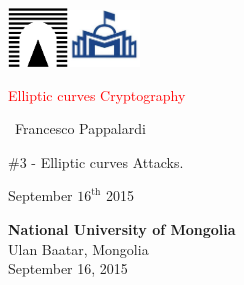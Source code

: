 \documentclass[10pt,handout]{beamer} %
\title[Elliptic curves over $\F_{q}$]{\insertlecture}
\theoremstyle{definition}
\begin{document}
\begin{frame}
\includegraphics[width=1.6cm]{images/roma3.pdf}\hfill\includegraphics[width=1.9cm]{images/NUM2.jpeg}
\vfill

\begin{center}\begin{sc}
\begin{Large}

\textcolor{red}{Elliptic curves Cryptography}
\end{Large}\bigskip

\ {Francesco Pappalardi}\bigskip\bigskip

\begin{large}\begin{bf}\#3 - Elliptic curves Attacks.
\end{bf}\end{large}\medskip

September $16^{\text{th}}$ 2015\medskip
\vfill
\end{sc}\end{center}

\begin{minipage}[b]{9.3cm}
\textbf{National University of Mongolia}\\  %
Ulan Baatar, Mongolia\\
September 16, 2015
\end{minipage}\hfill
\end{frame}
\end{document}
